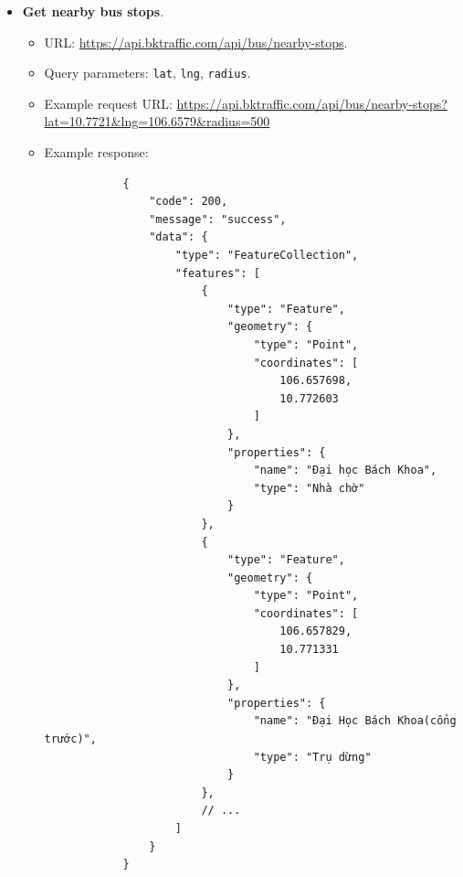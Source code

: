 \begin{itemize}
    \item \textbf{Get nearby bus stops}.
    \begin{itemize}
        \item URL: \url{https://api.bktraffic.com/api/bus/nearby-stops}.
        \item Query parameters: \lstinline{lat}, \lstinline{lng}, \lstinline{radius}.
        \item Example request URL: \url{https://api.bktraffic.com/api/bus/nearby-stops?lat=10.7721&lng=106.6579&radius=500}
        \item Example response: 
        \begin{lstlisting}
            {
                "code": 200,
                "message": "success",
                "data": {
                    "type": "FeatureCollection",
                    "features": [
                        {
                            "type": "Feature",
                            "geometry": {
                                "type": "Point",
                                "coordinates": [
                                    106.657698,
                                    10.772603
                                ]
                            },
                            "properties": {
                                "name": "Đại học Bách Khoa",
                                "type": "Nhà chờ"
                            }
                        },
                        {
                            "type": "Feature",
                            "geometry": {
                                "type": "Point",
                                "coordinates": [
                                    106.657829,
                                    10.771331
                                ]
                            },
                            "properties": {
                                "name": "Đại Học Bách Khoa(cổng trước)",
                                "type": "Trụ dừng"
                            }
                        },
                        // ...
                    ]
                }
            }
        \end{lstlisting}
    \end{itemize}


\end{itemize}
